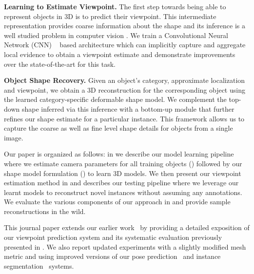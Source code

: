 \vspace{2mm}
\noindent \textbf{Learning to Estimate Viewpoint.}
The first step towards being able to represent objects in 3D is to predict their viewpoint. This intermediate representation provides coarse information about the shape and its inference is a well studied problem in computer vision \cite{huttenlocher1990recognizing, rothganger20063d, gordon2006and, savarese2008view, xiao2008structuring, gu2010discriminative, ozuysal2009pose}.
We train a Convolutional Neural Network (CNN) ~\cite{neocognitron,LeCun1989} based architecture which can implicitly capture and aggregate local evidence to obtain a viewpoint estimate and demonstrate improvements over the state-of-the-art for this task.

\vspace{2mm}
\noindent \textbf{Object Shape Recovery.}
Given an object's category, approximate localization and viewpoint, we obtain a 3D reconstruction for the corresponding object using the learned category-specific deformable shape model. We complement the top-down shape inferred via this inference with a bottom-up module that further refines our shape estimate for a particular instance. This framework allows us to capture the coarse as well as fine level shape details for objects from a single image.

Our paper is organized as follows: in  we describe our model learning pipeline where we estimate camera parameters for all training objects () followed by our shape model formulation () to learn 3D models. We then present our viewpoint estimation method in  and   describes our testing pipeline where we leverage our learnt models to reconstruct novel instances without assuming any annotations. We evaluate the various components of our approach in  and provide sample reconstructions in the wild.

This journal paper extends our earlier work~\cite{categoryShapesKar15} by providing a detailed exposition of our viewpoint prediction system and its systematic evaluation previously presented in \cite{ShubhamPose}. We also report updated experiments with a slightly modified mesh metric and using improved versions of our pose prediction~\cite{ShubhamPose} and instance segmentation~\cite{BharathCVPR2015} systems.